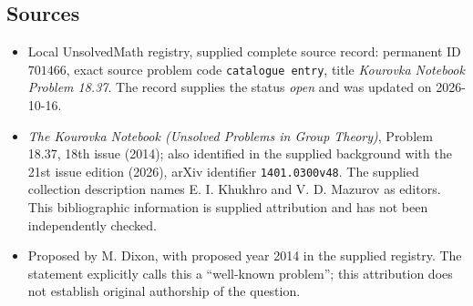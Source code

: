 \documentclass[11pt]{article}
\begin{document}
\subsection{Sources}
\begin{itemize}
\item Local UnsolvedMath registry, supplied complete source record: permanent ID \(701466\), exact source problem code \texttt{catalogue entry}, title \emph{Kourovka Notebook Problem 18.37}. The record supplies the status \emph{open} and was updated on 2026-10-16.
\item \emph{The Kourovka Notebook (Unsolved Problems in Group Theory)}, Problem 18.37, 18th issue (2014); also identified in the supplied background with the 21st issue edition (2026), arXiv identifier \texttt{1401.0300v48}. The supplied collection description names E. I. Khukhro and V. D. Mazurov as editors. This bibliographic information is supplied attribution and has not been independently checked.
\item Proposed by M. Dixon, with proposed year 2014 in the supplied registry. The statement explicitly calls this a ``well-known problem''; this attribution does not establish original authorship of the question.
\end{itemize}
\end{document}
